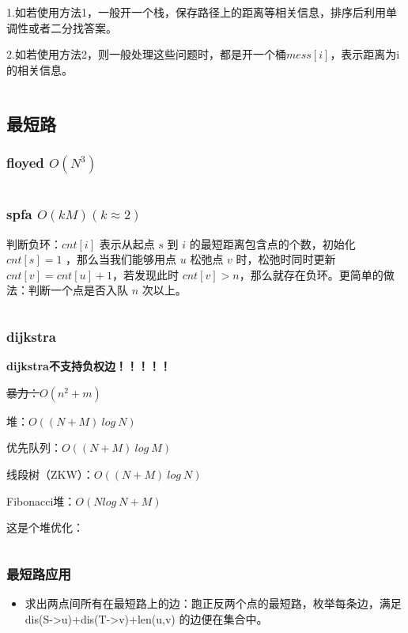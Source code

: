 \documentclass[a4paper,11pt]{article}
\begin{document}
1.如若使用方法1，一般开一个栈，保存路径上的距离等相关信息，排序后利用单调性或者二分找答案。

2.如若使用方法2，则一般处理这些问题时，都是开一个桶\(mess[i]\)，表示距离为i的相关信息。

\inputminted[linenos]{c++}{graph/dianfenzhi.cpp}

\subsection{最短路}
\subsubsection{floyed \texorpdfstring{\(O(N^3)\)}{O(N3)}}
\inputminted[linenos]{c++}{graph/floyed.cpp}
\subsubsection{spfa \texorpdfstring{\(O(kM)(k\approx 2)\)}{O(kM)(k ≈ 2)}}
判断负环：\(cnt[i]\) 表示从起点 \(s\) 到 \(i\)
的最短距离包含点的个数，初始化 \(cnt[s]=1\) ，那么当我们能够用点 \(u\)
松弛点 \(v\) 时，松弛时同时更新 \(cnt[ v ] = cnt[ u ] + 1\)，若发现此时
\(cnt[ v ] > n\)，那么就存在负环。更简单的做法：判断一个点是否入队 \(n\)
次以上。
\inputminted[linenos,breaklines]{c++}{graph/spfa.cpp}
\subsubsection{dijkstra}
\textbf{dijkstra不支持负权边！！！！！}

\sout{暴力：\texorpdfstring{\(O(n^2+m)\)}{O(N2M)}}

堆：\(O((N+M)\ log\ N)\)

优先队列：\(O((N+M)\ log\ M)\)

线段树（ZKW）：\(O((N+M)\ log\ N)\)

Fibonacci堆：\(O(Nlog\ N+M)\)

这是个堆优化：
\inputminted[linenos]{c++}{graph/dijkstraheap.cpp}

\subsubsection{最短路应用}
\begin{itemize}
\item
  求出两点间所有在最短路上的边：跑正反两个点的最短路，枚举每条边，满足 dis(S->u)+dis(T->v)+len(u,v) 的边便在集合中。
\end{itemize}
\end{document}
